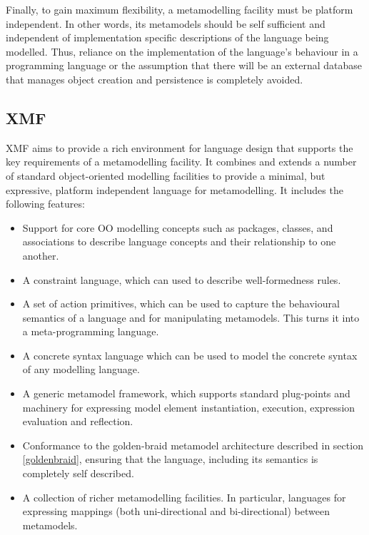 Finally, to gain maximum flexibility, a metamodelling facility
must be platform independent. In other words, its metamodels
should be self sufficient and independent of implementation
specific descriptions of the language being modelled. Thus,
reliance on the implementation of the language's behaviour in a
programming language or the assumption that there will be an
external database that manages object creation and persistence is
completely avoided.

\subsection{XMF}

XMF aims to provide a rich environment for language design that
supports the key requirements of a metamodelling facility. It
combines and extends a number of standard object-oriented
modelling facilities to provide a minimal, but expressive,
platform independent language for metamodelling. It includes the
following features:

\begin{itemize}

\item Support for core OO modelling concepts such as packages, classes, and
associations to describe language concepts and their relationship to one another.

\item A constraint language, which can used to describe well-formedness rules.

\item A set of action primitives, which can be used to capture the behavioural
semantics of a language and for manipulating metamodels. This
turns it into a meta-programming language.

\item A concrete syntax language which can be used to model the concrete
syntax of any modelling language.

\item A generic metamodel framework, which supports standard plug-points
and machinery for expressing model element instantiation,
execution, expression evaluation and reflection.

\item Conformance to the golden-braid metamodel architecture
described in section \ref{goldenbraid}, ensuring that the
language, including its semantics is completely self described.

\item A collection of richer metamodelling facilities. In particular,
languages for expressing mappings (both uni-directional and
bi-directional) between metamodels.

\end{itemize}

